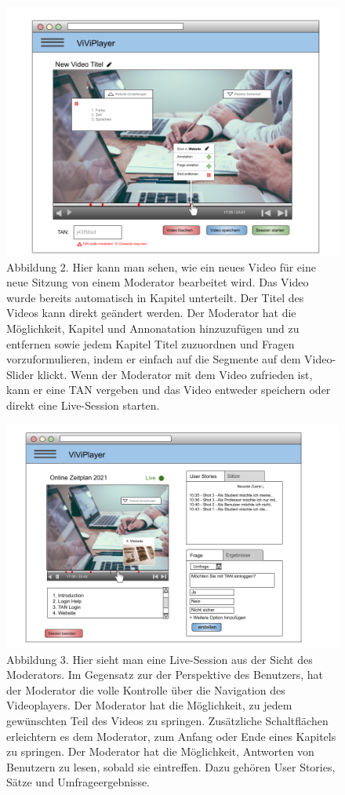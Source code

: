 \begin{figure}
  \includegraphics[width=\linewidth]{5dot2.png}
  \caption{Abbildung 2. Hier kann man sehen, wie ein neues Video für eine neue Sitzung von einem Moderator bearbeitet wird. Das Video wurde bereits automatisch in Kapitel unterteilt. Der Titel des Videos kann direkt geändert werden. Der Moderator hat die Möglichkeit, Kapitel und Annonatation hinzuzufügen und zu entfernen sowie jedem Kapitel Titel zuzuordnen und Fragen vorzuformulieren, indem er einfach auf die Segmente auf dem Video-Slider klickt. Wenn der Moderator mit dem Video zufrieden ist, kann er eine TAN vergeben und das Video entweder speichern oder direkt eine Live-Session starten.}
  \label{fig:5dot2}
\end{figure}

\begin{figure}
  \includegraphics[width=\linewidth]{5dot3.png}
  \caption{Abbildung 3. Hier sieht man eine Live-Session aus der Sicht des Moderators. Im Gegensatz zur der Perspektive des Benutzers, hat der Moderator die volle Kontrolle über die Navigation des Videoplayers. Der Moderator hat die Möglichkeit, zu jedem gewünschten Teil des Videos zu springen. Zusätzliche Schaltflächen erleichtern es dem Moderator, zum Anfang oder Ende eines Kapitels zu springen. Der Moderator hat die Möglichkeit, Antworten von Benutzern zu lesen, sobald sie eintreffen. Dazu gehören User Stories, Sätze und Umfrageergebnisse.}
  \label{fig:5dot3}
\end{figure}
